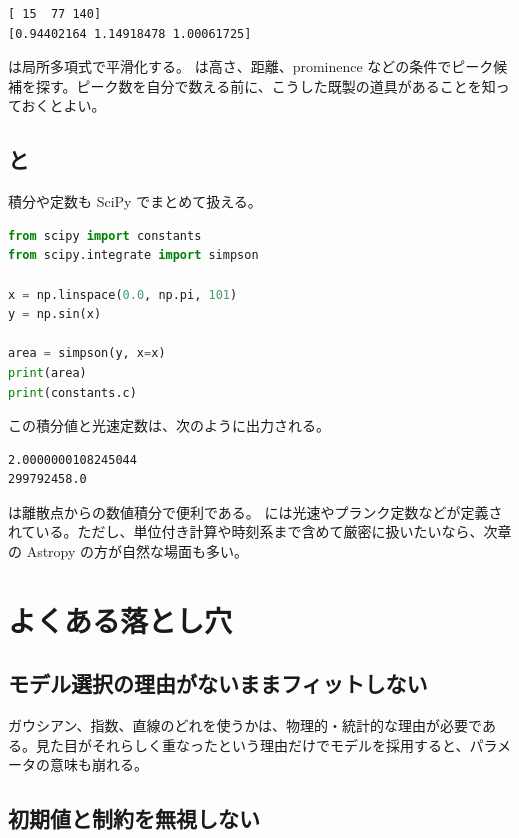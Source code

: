 \begin{lstlisting}[numbers=none, xleftmargin=2\zw]
[ 15  77 140]
[0.94402164 1.14918478 1.00061725]
\end{lstlisting}

 は局所多項式で平滑化する。 は高さ、距離、prominence などの条件でピーク候補を探す。ピーク数を自分で数える前に、こうした既製の道具があることを知っておくとよい。

\subsection{ と }

積分や定数も SciPy でまとめて扱える。

\begin{lstlisting}[language=Python]
from scipy import constants
from scipy.integrate import simpson

x = np.linspace(0.0, np.pi, 101)
y = np.sin(x)

area = simpson(y, x=x)
print(area)
print(constants.c)
\end{lstlisting}

この積分値と光速定数は、次のように出力される。

\begin{lstlisting}[numbers=none, xleftmargin=2\zw]
2.0000000108245044
299792458.0
\end{lstlisting}

 は離散点からの数値積分で便利である。 には光速やプランク定数などが定義されている。ただし、単位付き計算や時刻系まで含めて厳密に扱いたいなら、次章の Astropy の方が自然な場面も多い。

\section{よくある落とし穴}

\subsection{モデル選択の理由がないままフィットしない}

ガウシアン、指数、直線のどれを使うかは、物理的・統計的な理由が必要である。見た目がそれらしく重なったという理由だけでモデルを採用すると、パラメータの意味も崩れる。

\subsection{初期値と制約を無視しない}

